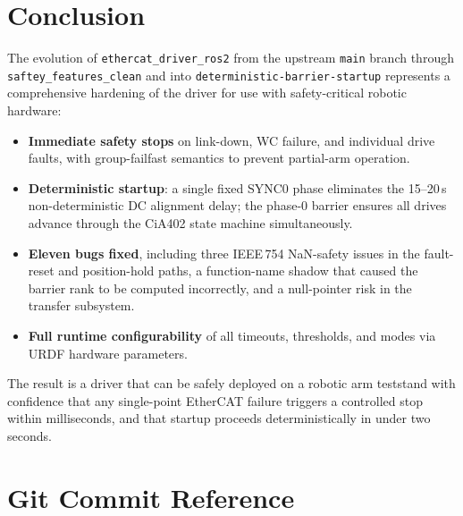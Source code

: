 \documentclass[11pt,a4paper]{article}
\begin{document}
\section{Conclusion}
\label{sec:conclusion}

The evolution of \texttt{ethercat\_driver\_ros2} from the upstream
\texttt{main} branch through \texttt{saftey\_features\_clean} and into
\texttt{deterministic-barrier-startup} represents a comprehensive hardening of
the driver for use with safety-critical robotic hardware:

\begin{itemize}[nosep]
  \item \textbf{Immediate safety stops} on link-down, WC failure, and
        individual drive faults, with group-failfast semantics to prevent
        partial-arm operation.
  \item \textbf{Deterministic startup}: a single fixed SYNC0 phase eliminates
        the 15--20\,s non-deterministic DC alignment delay; the phase-0
        barrier ensures all drives advance through the CiA402 state machine
        simultaneously.
  \item \textbf{Eleven bugs fixed}, including three IEEE\,754 NaN-safety
        issues in the fault-reset and position-hold paths, a function-name
        shadow that caused the barrier rank to be computed incorrectly, and
        a null-pointer risk in the transfer subsystem.
  \item \textbf{Full runtime configurability} of all timeouts, thresholds,
        and modes via URDF hardware parameters.
\end{itemize}

The result is a driver that can be safely deployed on a robotic arm teststand
with confidence that any single-point EtherCAT failure triggers a controlled
stop within milliseconds, and that startup proceeds deterministically in under
two seconds.

\appendix

\section{Git Commit Reference}
\label{app:commits}
\end{document}
